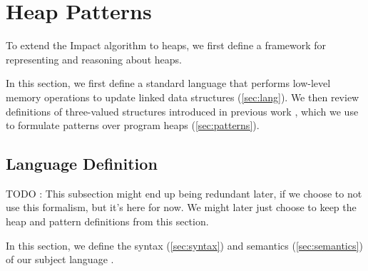 
\section{Heap Patterns}
\label{sec:heap-patterns}
%

To extend the Impact algorithm to heaps, we first define a framework for representing and reasoning about heaps.


In this section, we first define a standard language that performs low-level
memory operations to update linked data structures
(\autoref{sec:lang}).
%
We then review definitions of three-valued structures introduced in
previous work \cite{sagiv02}, which we use to formulate patterns over
program heaps (\autoref{sec:patterns}).

\subsection{Language Definition}
\label{sec:lang}
%
TODO : This subsection might end up being redundant later, if we choose to not use this \lang formalism, but it's here for now. We might later just choose to keep the heap and pattern definitions from this section.

In this section, we define the syntax (\autoref{sec:syntax}) and
semantics (\autoref{sec:semantics}) of our subject language \lang.

